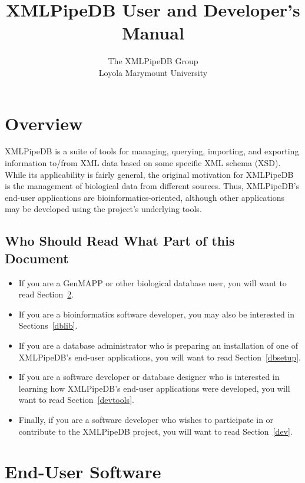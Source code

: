 \documentclass[11pt]{article}
\title{XMLPipeDB User and Developer's Manual}
\author{The XMLPipeDB Group\\
Loyola Marymount University
}
\begin{document}
\maketitle

\pagebreak
\tableofcontents
\pagebreak

\section{Overview}

XMLPipeDB is a suite of tools for managing, querying, importing, and exporting information to/from XML data based on some specific XML schema (XSD).  While its applicability is fairly general, the original motivation for XMLPipeDB is the management of biological data from different sources.  Thus, XMLPipeDB's end-user applications are bioinformatics-oriented, although other applications may be developed using the project's underlying tools.

\subsection{Who Should Read What Part of this Document}

\begin{itemize}
\item If you are a GenMAPP or other biological database user, you will want to read Section~\ref{endUserSoftware}.

\item If you are a bioinformatics software developer, you may also be interested in Sections~\ref{dblib}.

\item If you are a database administrator who is preparing an installation of one of XMLPipeDB's end-user applications, you will want to read Section~\ref{dbsetup}.

\item If you are a software developer or database designer who is interested in learning how XMLPipeDB's end-user applications were developed, you will want to read Section~\ref{devtools}.

\item Finally, if you are a software developer who wishes to participate in or contribute to the XMLPipeDB project, you will want to read Section~\ref{dev}.
\end{itemize}

\section{End-User Software}
\label{endUserSoftware}
\end{document}
